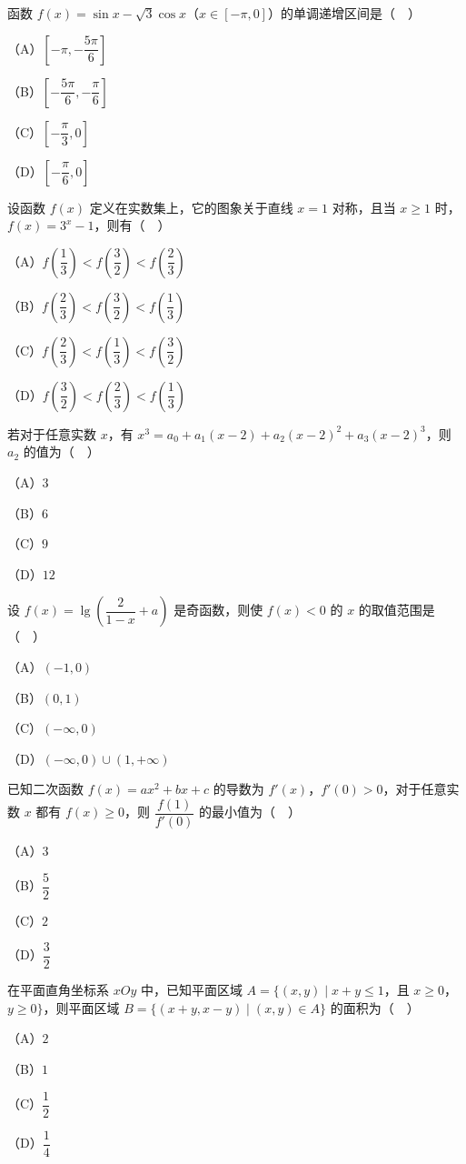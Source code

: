 \begin{question}
函数 $f(x)=\sin x-\sqrt3\cos x$（$x\in[-\pi,0]$）的单调递增区间是（　）

（A）$\left[-\pi,-\dfrac{5\pi}{6}\right]$

（B）$\left[-\dfrac{5\pi}{6},-\dfrac{\pi}{6}\right]$

（C）$\left[-\dfrac{\pi}{3},0\right]$

（D）$\left[-\dfrac{\pi}{6},0\right]$

\end{question}
\begin{question}
设函数 $f(x)$ 定义在实数集上，它的图象关于直线 $x=1$ 对称，且当 $x\geqslant1$ 时，$f(x)=3^x-1$，则有（　）

（A）$f\left(\dfrac13\right)<f\left(\dfrac32\right)<f\left(\dfrac23\right)$

（B）$f\left(\dfrac23\right)<f\left(\dfrac32\right)<f\left(\dfrac13\right)$

（C）$f\left(\dfrac23\right)<f\left(\dfrac13\right)<f\left(\dfrac32\right)$

（D）$f\left(\dfrac32\right)<f\left(\dfrac23\right)<f\left(\dfrac13\right)$

\end{question}
\begin{question}
若对于任意实数 $x$，有 $x^3=a_0+a_1(x-2)+a_2(x-2)^2+a_3(x-2)^3$，则 $a_2$ 的值为（　）

（A）$3$

（B）$6$

（C）$9$

（D）$12$

\end{question}
\begin{question}
设 $f(x)=\lg\left(\dfrac{2}{1-x}+a\right)$ 是奇函数，则使 $f(x)<0$ 的 $x$ 的取值范围是（　）

（A）$(-1,0)$

（B）$(0,1)$

（C）$(-\infty,0)$

（D）$(-\infty,0)\cup(1,+\infty)$

\end{question}
\begin{question}
已知二次函数 $f(x)=ax^2+bx+c$ 的导数为 $f'(x)$，$f'(0)>0$，对于任意实数 $x$ 都有 $f(x)\geqslant0$，则 $\dfrac{f(1)}{f'(0)}$ 的最小值为（　）

（A）$3$

（B）$\dfrac52$

（C）$2$

（D）$\dfrac32$

\end{question}
\begin{question}
在平面直角坐标系 $xOy$ 中，已知平面区域 $A=\{(x,y)\mid x+y\leqslant1$，且 $x\geqslant0$，$y\geqslant0\}$，则平面区域 $B=\{(x+y,x-y)\mid(x,y)\in A\}$ 的面积为（　）

（A）$2$

（B）$1$

（C）$\dfrac12$

（D）$\dfrac14$

\end{question}

